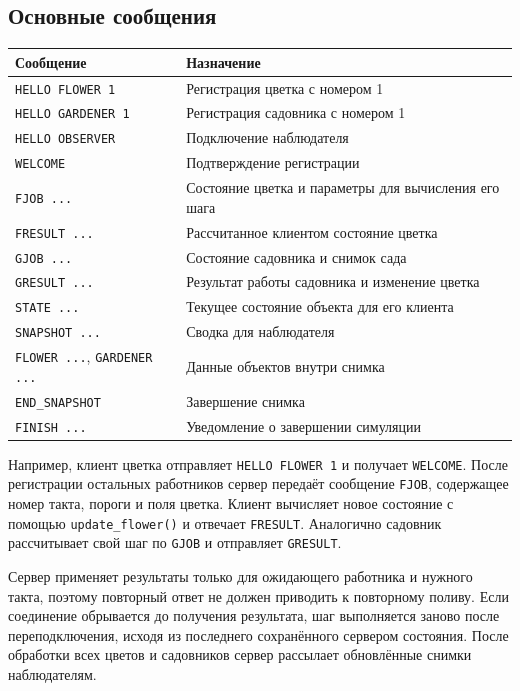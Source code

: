 \documentclass[12pt,a4paper]{article}
\begin{document}
\subsection{Основные сообщения}
\begin{longtable}{|p{}|p{}|}
\hline
Сообщение & Назначение\\ \hline
\endhead
\texttt{HELLO FLOWER 1} & Регистрация цветка с номером 1\\ \hline
\texttt{HELLO GARDENER 1} & Регистрация садовника с номером 1\\ \hline
\texttt{HELLO OBSERVER} & Подключение наблюдателя\\ \hline
\texttt{WELCOME} & Подтверждение регистрации\\ \hline
\texttt{FJOB ...} & Состояние цветка и параметры для вычисления его шага\\ \hline
\texttt{FRESULT ...} & Рассчитанное клиентом состояние цветка\\ \hline
\texttt{GJOB ...} & Состояние садовника и снимок сада\\ \hline
\texttt{GRESULT ...} & Результат работы садовника и изменение цветка\\ \hline
\texttt{STATE ...} & Текущее состояние объекта для его клиента\\ \hline
\texttt{SNAPSHOT ...} & Сводка для наблюдателя\\ \hline
\texttt{FLOWER ...}, \texttt{GARDENER ...} & Данные объектов внутри снимка\\ \hline
\texttt{END\_SNAPSHOT} & Завершение снимка\\ \hline
\texttt{FINISH ...} & Уведомление о завершении симуляции\\ \hline
\end{longtable}

Например, клиент цветка отправляет \texttt{HELLO FLOWER 1} и получает \texttt{WELCOME}. После регистрации остальных работников сервер передаёт сообщение \texttt{FJOB}, содержащее номер такта, пороги и поля цветка. Клиент вычисляет новое состояние с помощью \texttt{update\_flower()} и отвечает \texttt{FRESULT}. Аналогично садовник рассчитывает свой шаг по \texttt{GJOB} и отправляет \texttt{GRESULT}.

Сервер применяет результаты только для ожидающего работника и нужного такта, поэтому повторный ответ не должен приводить к повторному поливу. Если соединение обрывается до получения результата, шаг выполняется заново после переподключения, исходя из последнего сохранённого сервером состояния. После обработки всех цветов и садовников сервер рассылает обновлённые снимки наблюдателям.
\end{document}
